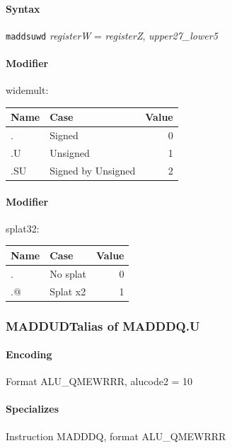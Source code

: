 {\paragraph{Syntax} \texttt{maddsuwd} \emph{registerW} = \emph{registerZ}, \emph{upper27\_lower5}

\paragraph{Modifier} \textsf{widemult}:\\

\noindent \begin{tabular}{|l|l|r|} \hline
\bf{Name} & \bf{Case} & \bf{Value} \\ \hline
. & Signed & 0 \\
.U & Unsigned & 1 \\
.SU & Signed by Unsigned & 2 \\
\hline \end{tabular}

\paragraph{Modifier} \textsf{splat32}:\\

\noindent \begin{tabular}{|l|l|r|} \hline
\bf{Name} & \bf{Case} & \bf{Value} \\ \hline
. & No splat & 0 \\
.@ & Splat x2 & 1 \\
\hline \end{tabular}
\newpage
\subsubsection[{\small MADDUDT: alias of MADDDQ.U}]{MADDUDT\hfill alias of MADDDQ.U}
\label{instr:MADDUDT}

\paragraph{Encoding} Format \textsf{ALU\_QMEWRRR, alucode2 = 10}\\



\paragraph{Specializes} Instruction MADDDQ, format ALU\_QMEWRRR

}
